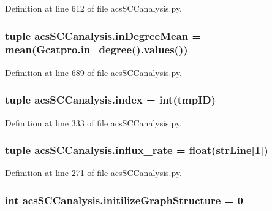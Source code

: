Definition at line 612 of file acs\+S\+C\+Canalysis.\+py.

\hypertarget{a00130_a5004d18b8cfa2803620a9cd7f32d9775}{
\subsubsection[{in\+Degree\+Mean}]{\setlength{\rightskip}{0pt plus 5cm}tuple acs\+S\+C\+Canalysis.\+in\+Degree\+Mean = mean(Gcatpro.\+in\+\_\+degree().values())}}\label{a00130_a5004d18b8cfa2803620a9cd7f32d9775}


Definition at line 689 of file acs\+S\+C\+Canalysis.\+py.

\hypertarget{a00130_aaac3bb67a998c4a09aeed8f1adec2f9c}{
\subsubsection[{index}]{\setlength{\rightskip}{0pt plus 5cm}tuple acs\+S\+C\+Canalysis.\+index = int(tmp\+I\+D)}}\label{a00130_aaac3bb67a998c4a09aeed8f1adec2f9c}


Definition at line 333 of file acs\+S\+C\+Canalysis.\+py.

\hypertarget{a00130_a3a8adee26325d72aca909e91b0fd3ea5}{
\subsubsection[{influx\+\_\+rate}]{\setlength{\rightskip}{0pt plus 5cm}tuple acs\+S\+C\+Canalysis.\+influx\+\_\+rate = float({\bf str\+Line}\mbox{[}1\mbox{]})}}\label{a00130_a3a8adee26325d72aca909e91b0fd3ea5}


Definition at line 271 of file acs\+S\+C\+Canalysis.\+py.

\hypertarget{a00130_ac6ad18bfc83e8ea3254897d46f990855}{
\subsubsection[{initilize\+Graph\+Structure}]{\setlength{\rightskip}{0pt plus 5cm}int acs\+S\+C\+Canalysis.\+initilize\+Graph\+Structure = 0}}\label{a00130_ac6ad18bfc83e8ea3254897d46f990855}


